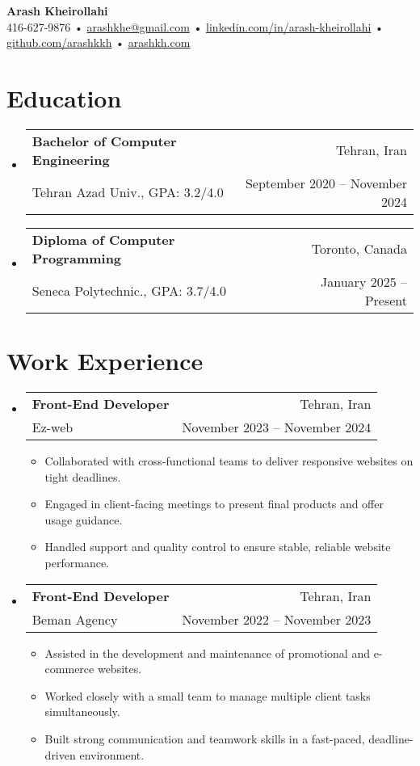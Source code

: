 \documentclass[letterpaper,11pt]{article}
\makeatletter
\let\hrefWithoutArrow\href
\renewcommand{\href}[2]{\hrefWithoutArrow{#1}{\ifthenelse{\equal{#2}{}}{ }{#2\ }\raisebox{.15ex}{\footnotesize \faExternalLink*}}}
\newcommand{\resumeItemNH}[1]{
  \item\small{
    {#1 \vspace{-2pt}}
  }
}
\newcommand{\resumeSubheading}[4]{
  \vspace{-1pt}\item
    \begin{tabular*}{\textwidth}{l@{\extracolsep{\fill}}r}
      \textbf{#1} & #2 \\
      \small#3 & \small #4 \\
    \end{tabular*}\vspace{-6pt}
}
\newcommand{\resumeSubHeadingListStart}{\begin{itemize}[leftmargin=0pt,label={}]}
\newcommand{\resumeSubHeadingListEnd}{\end{itemize}}
\newcommand{\resumeItemListStart}{\begin{itemize}}
\newcommand{\resumeItemListEnd}{\end{itemize}}
\makeatother
\begin{document}
{\LARGE \textbf{Arash Kheirollahi}}\\[0.5em]
\small
416-627-9876 •
\hrefWithoutArrow{mailto:arashkhe@gmail.com}{arashkhe@gmail.com} •
\hrefWithoutArrow{https://www.linkedin.com/in/arash-kheirollahi/}{linkedin.com/in/arash-kheirollahi} •
\hrefWithoutArrow{https://github.com/arashkkh}{github.com/arashkkh} •
\hrefWithoutArrow{https://www.arashkh.com}{arashkh.com}\\[0.6em]

\section{Education}
  \resumeSubHeadingListStart
    \resumeSubheading
      {Bachelor of Computer Engineering}{Tehran, Iran}
      {Tehran Azad Univ., GPA: 3.2/4.0}{September 2020 -- November 2024}
  \resumeSubHeadingListEnd
  \resumeSubHeadingListStart
    \resumeSubheading
      {Diploma of Computer Programming}{Toronto, Canada}
      {Seneca Polytechnic., GPA: 3.7/4.0}{January 2025 -- Present}
  \resumeSubHeadingListEnd

\section{Work Experience}
  \resumeSubHeadingListStart
    \resumeSubheading
      {Front-End Developer}{Tehran, Iran}
      {Ez-web}{November 2023 -- November 2024}
      \resumeItemListStart
        \resumeItemNH{Collaborated with cross-functional teams to deliver responsive websites on tight deadlines.}
        \resumeItemNH{Engaged in client-facing meetings to present final products and offer usage guidance.}
        \resumeItemNH{Handled support and quality control to ensure stable, reliable website performance.}
      \resumeItemListEnd

    \resumeSubheading
      {Front-End Developer}{Tehran, Iran}
      {Beman Agency}{November 2022 -- November 2023}
      \resumeItemListStart
        \resumeItemNH{Assisted in the development and maintenance of promotional and e-commerce websites.}
        \resumeItemNH{Worked closely with a small team to manage multiple client tasks simultaneously.}
        \resumeItemNH{Built strong communication and teamwork skills in a fast-paced, deadline-driven environment.}
      \resumeItemListEnd
  \resumeSubHeadingListEnd
\end{document}
